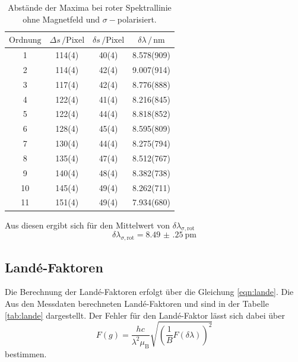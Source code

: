 \begin{table}
    \centering
    \caption{Abstände der Maxima bei roter Spektrallinie ohne Magnetfeld und $\sigma-$polarisiert.}
    \label{tab:maxima_rot_sigma}
    \begin{tabular}{S S S S}
        \toprule
        $\text{Ordnung}$ & $\Delta s \, /\text{Pixel}$  & $\delta s \, /\text{Pixel}$ & $\delta \lambda \, / \, \si{\nano\meter}$  \\
          & 114(4) & 40(4)  &  8.578(909) \\ 
        2  & 114(4) & 42(4)  &  9.007(914) \\
        3  & 117(4) & 42(4)  &  8.776(888) \\
        4  & 122(4) & 41(4)  &  8.216(845) \\
        5  & 122(4) & 44(4)  &  8.818(852) \\ 
        6  & 128(4) & 45(4)  &  8.595(809) \\
        7  & 130(4) & 44(4)  &  8.275(794) \\
        8  & 135(4) & 47(4)  &  8.512(767) \\
        9  & 140(4) & 48(4)  &  8.382(738) \\
        10 & 145(4) & 49(4)  &  8.262(711) \\
        11 & 151(4) & 49(4)  &  7.934(680) \\
        \bottomrule

    \end{tabular}
\end{table}

Aus diesen ergibt sich für den Mittelwert von $\delta\lambda_{\sigma,\text{rot}}$
\begin{equation}
    \delta\lambda_{\sigma,\text{rot}} = \SI{8.49(25)}{\pico\m}
\end{equation}

\subsection{Landé-Faktoren}

Die Berechnung der Landé-Faktoren erfolgt über die Gleichung \ref{eqn:lande}. Die Aus den Messdaten berechneten Landé-Faktoren und  
sind in der Tabelle \ref{tab:lande} dargestellt. Der Fehler für den Landé-Faktor lässt sich dabei über 
\begin{equation}
    F(g) = \frac{hc}{\lambda^2 \mu _\text{B}} \sqrt{\left ( \frac{1}{B} F(\delta \lambda) \right)^2}
\end{equation} bestimmen. 

